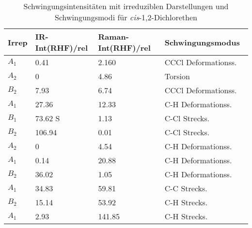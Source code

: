 \documentclass[12pt]{article}
\begin{document}
\begin{onehalfspace}
\begin{table}[!htpb]
\caption{Schwingungsintensitäten mit irreduziblen Darstellungen und Schwingungsmodi für
\textit{cis}-1,2-Dichlorethen}
\begin{tabular}{llll}
\midrule
Irrep & IR-Int(RHF)/rel & Raman-Int(RHF)/rel & Schwingungsmodus~\cite{cisvib} \\
\midrule
$A _1$ & 0.41 & 2.160   & CCCl Deformationss.\\
$A _2$ & 0 & 4.86       & Torsion\\
$B _2$ & 7.93 & 6.74    &  CCCl Deformationss.\\
$A _1$ & 27.36 & 12.33  & C-H Deformationss.\\
$B _1$ & 73.62 S & 1.13   & C-Cl Strecks.\\
$B _2$ & 106.94 & 0.01  & C-Cl Strecks.\\
$A _2$ & 0 & 4.54       & C-H Deformationss.\\
$A _1$ & 0.14 & 20.88   & C-H Deformationss.\\
$B _2$ & 36.02 & 1.05   & C-H Deformationss.\\
$A _1$ & 34.83 & 59.81  & C-C Strecks.\\
$B _2$ & 15.14 & 53.92  & C-H Strecks.\\
$A _1$ & 2.93 & 141.85  & C-H Strecks.\\
\bottomrule
\end{tabular}
\label{tab:cisschwings}

\end{table}



\begin{table}[!htpb]


\end{table}
\end{onehalfspace}
\end{document}

